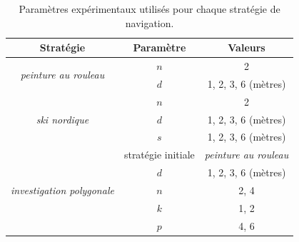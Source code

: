 \documentclass[francais,RandD]{rapportPFE}
\begin{document}
		\begin{table}[h!]
			\centering
			\begin{tabular}{|c|c|c|}
				\hline
				Stratégie & Paramètre & Valeurs \\
				\hline
				\multirow{2}{*}{\textit{peinture au rouleau}} & $n$ & 2 \\
				& $d$ & 1, 2, 3, 6 (mètres) \\
				\hline
				\multirow{3}{*}{\textit{ski nordique}} & $n$ & 2 \\
				& $d$ & 1, 2, 3, 6 (mètres) \\
				& $s$ & 1, 2, 3, 6 (mètres) \\
				\hline
				\multirow{5}{*}{\textit{investigation polygonale}} & stratégie initiale & \textit{peinture au rouleau} \\
				& $d$ & 1, 2, 3, 6 (mètres) \\
				& $n$ & 2, 4 \\
				& $k$ & 1, 2 \\
				& $p$ & 4, 6 \\
				\hline
			\end{tabular}
			\caption{Paramètres expérimentaux utilisés pour chaque stratégie de navigation.}
			\label{tab:exp_params}
		\end{table}
\end{document}
